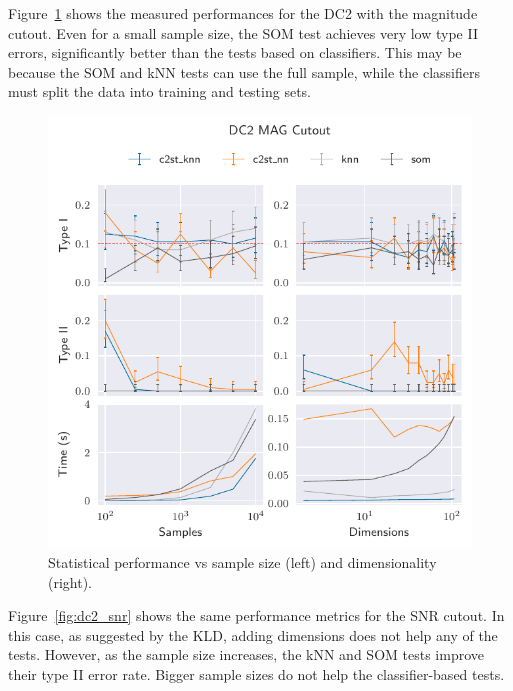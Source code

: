 Figure~\ref{fig:dc2_mag} shows the measured performances for the DC2 with the magnitude
cutout. Even for a small sample size, the \gls{SOM}  test achieves very low type II errors, 
significantly better than the tests based on classifiers.
This may be because the \gls{SOM} and \gls{kNN}
tests can use the full sample, while the classifiers must split the data into training and testing sets.


\begin{figure}[htpb]
    \centering
    \includegraphics{images/6_som/dc2_mag}
    \caption[Statistical performance vs sample size and dimensionality.]{
    Statistical performance vs sample size (left) and dimensionality (right).}
    \label{fig:dc2_mag}
\end{figure}

Figure~\ref{fig:dc2_snr} shows the same performance metrics for the \gls{SNR} cutout.
In this case, as suggested by the \gls{KLD}, adding dimensions does not help any of the tests.
However, as the sample size increases, the \gls{kNN} and \gls{SOM}
tests improve their type II error rate. Bigger sample sizes do not help
the classifier-based tests.

